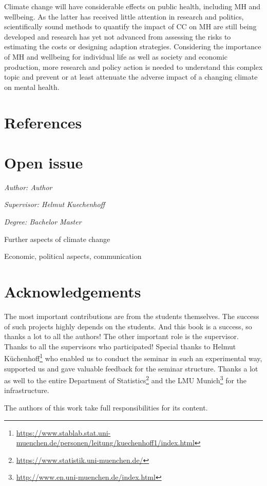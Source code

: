 \documentclass[
]{krantz}
\renewcommand{\href}[2]{#2\footnote{\url{#1}}}
\begin{document}
Climate change will have considerable effects on public health, including MH and wellbeing. As the latter has received little attention in research and politics, scientifically sound methods to quantify the impact of CC on MH are still being developed and research has yet not advanced from assessing the risks to estimating the costs or designing adaption strategies. Considering the importance of MH and wellbeing for individual life as well as society and economic production, more research and policy action is needed to understand this complex topic and prevent or at least attenuate the adverse impact of a changing climate on mental health.

\newpage

\chapter{References}\label{references}

\chapter{Open issue}\label{open-issue}

\emph{Author: Author}

\emph{Supervisor: Helmut Kuechenhoff}

\emph{Degree: Bachelor Master }

Further aspects of climate change

Economic, political aspects, communication

\citet{campbell} \citet{sun}

\chapter{Acknowledgements}\label{acknowledgements}

The most important contributions are from the students themselves.
The success of such projects highly depends on the students.
And this book is a success, so thanks a lot to all the authors!
The other important role is the supervisor.
Thanks to all the supervisors who participated!
Special thanks to \href{https://www.stablab.stat.uni-muenchen.de/personen/leitung/kuechenhoff1/index.html}{Helmut Küchenhoff} who enabled us to conduct the seminar in such an experimental way, supported us and gave valuable feedback for the seminar structure.
Thanks a lot as well to the entire \href{https://www.statistik.uni-muenchen.de/}{Department of Statistics} and the \href{http://www.en.uni-muenchen.de/index.html}{LMU Munich} for the infrastructure.

The authors of this work take full responsibilities for its content.

  

\backmatter
\printindex
\end{document}
